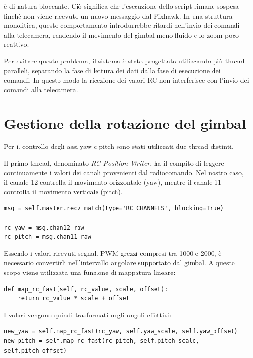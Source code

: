 è di natura bloccante.  
Ciò significa che l’esecuzione dello script rimane sospesa finché non viene ricevuto un nuovo messaggio dal Pixhawk.
In una struttura monolitica, questo comportamento introdurrebbe ritardi nell’invio dei comandi alla telecamera,
rendendo il movimento del gimbal meno fluido e lo zoom poco reattivo.

Per evitare questo problema, il sistema è stato progettato utilizzando più thread paralleli,
separando la fase di lettura dei dati dalla fase di esecuzione dei comandi.
In questo modo la ricezione dei valori RC non interferisce con l’invio dei comandi alla telecamera.

\bigskip
\section*{Gestione della rotazione del gimbal}

\bigskip

Per il controllo degli assi yaw e pitch sono stati utilizzati due thread distinti.

Il primo thread, denominato \textit{RC Position Writer}, ha il compito di leggere continuamente
i valori dei canali provenienti dal radiocomando.
Nel nostro caso, il canale 12 controlla il movimento orizzontale (yaw),
mentre il canale 11 controlla il movimento verticale (pitch).

\begin{verbatim}
msg = self.master.recv_match(type='RC_CHANNELS', blocking=True)

rc_yaw = msg.chan12_raw
rc_pitch = msg.chan11_raw
\end{verbatim}

Essendo i valori ricevuti segnali PWM grezzi compresi tra 1000 e 2000,
è necessario convertirli nell’intervallo angolare supportato dal gimbal.
A questo scopo viene utilizzata una funzione di mappatura lineare:

\begin{verbatim}
def map_rc_fast(self, rc_value, scale, offset):
    return rc_value * scale + offset
\end{verbatim}

I valori vengono quindi trasformati negli angoli effettivi:

\begin{verbatim}
new_yaw = self.map_rc_fast(rc_yaw, self.yaw_scale, self.yaw_offset)
new_pitch = self.map_rc_fast(rc_pitch, self.pitch_scale, self.pitch_offset)
\end{verbatim}

